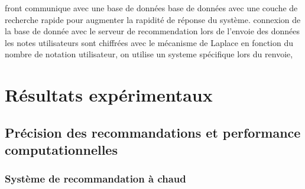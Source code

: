 \documentclass{article}
\begin{document}
front communique avec une base de données 
base de données avec une couche de recherche rapide pour augmenter la rapidité de réponse du système.
connexion de la base de donnée avec le serveur de recommendation
lors de l'envoie des données les notes utilisateurs sont chiffrées avec le mécanisme de Laplace
en fonction du nombre de notation utilisateur, on utilise un systeme spécifique
lors du renvoie, 





\section{Résultats expérimentaux}
    \subsection{Précision des recommandations et performance computationnelles}
    \subsubsection{Système de recommandation à chaud}
    $ $\\
    \\
    \\
    \\
    \\
    \\
    \\
    \\
\end{document}
